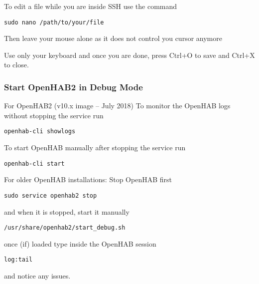 To edit a file while you are inside SSH use the command

\texttt{sudo nano /path/to/your/file}

Then leave your mouse alone as it does not control you cursor anymore

Use only your keyboard and once you are done, press Ctrl+O to save and Ctrl+X to close.

\subsubsection{Start OpenHAB2 in Debug Mode}

For OpenHAB2 (v10.x image -- July 2018)
To monitor the OpenHAB logs without stopping the service run

\texttt{openhab-cli showlogs}

To start OpenHAB manually after stopping the service run

\texttt{openhab-cli start}

For older OpenHAB installations:
Stop OpenHAB first

\texttt{sudo service openhab2 stop}

and when it is stopped, start it manually

\texttt{/usr/share/openhab2/start\_debug.sh}

once (if) loaded type inside the OpenHAB session

\texttt{log:tail}

and notice any issues.
